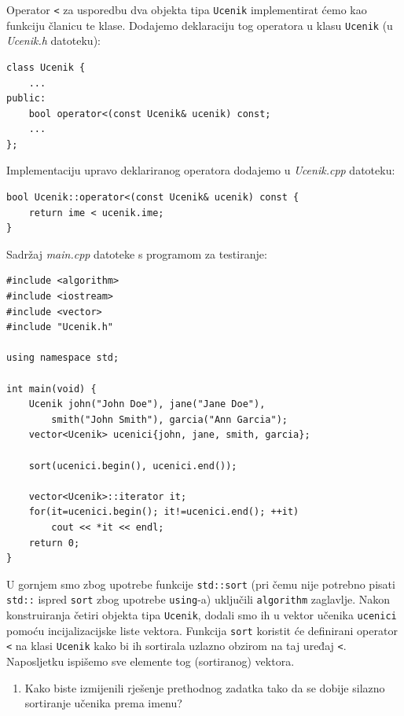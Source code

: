 \begin{rjesenje}
    Operator \texttt{<} za usporedbu dva objekta tipa \texttt{Ucenik}
    implementirat ćemo kao funkciju članicu te klase.
    Dodajemo deklaraciju tog operatora u klasu \texttt{Ucenik}
    (u \textit{Ucenik.h} datoteku):
    \begin{verbatim} 
class Ucenik {
    ...
public:
    bool operator<(const Ucenik& ucenik) const;
    ...
};
    \end{verbatim}
    Implementaciju upravo deklariranog operatora dodajemo u \textit{Ucenik.cpp} datoteku:
    \begin{verbatim}  
bool Ucenik::operator<(const Ucenik& ucenik) const { 
    return ime < ucenik.ime; 
}
    \end{verbatim}
    Sadržaj \textit{main.cpp} datoteke s programom za testiranje:
\begin{verbatim}
#include <algorithm>
#include <iostream>
#include <vector>
#include "Ucenik.h"

using namespace std;

int main(void) {
    Ucenik john("John Doe"), jane("Jane Doe"),
        smith("John Smith"), garcia("Ann Garcia");
    vector<Ucenik> ucenici{john, jane, smith, garcia};
    
    sort(ucenici.begin(), ucenici.end());
    
    vector<Ucenik>::iterator it;
    for(it=ucenici.begin(); it!=ucenici.end(); ++it)
        cout << *it << endl;
    return 0;
}
\end{verbatim}
U gornjem smo zbog upotrebe funkcije \texttt{std::sort}
(pri čemu nije potrebno pisati \texttt{std::} ispred \texttt{sort} zbog upotrebe \texttt{using}-a)
uključili \texttt{algorithm} zaglavlje.
Nakon konstruiranja četiri objekta tipa \texttt{Ucenik},
dodali smo ih u vektor učenika \texttt{ucenici}
pomoću incijalizacijske liste vektora.
Funkcija \texttt{sort} koristit će definirani operator \texttt{<} na klasi \texttt{Ucenik}
kako bi ih sortirala uzlazno obzirom na taj uređaj \texttt{<}.
Naposljetku ispišemo sve elemente tog (sortiranog) vektora.
\end{rjesenje}


\begin{razmisljanje}
    \begin{enumerate}
        \item 
        Kako biste izmijenili rješenje prethodnog zadatka tako da se dobije silazno
        sortiranje učenika prema imenu?
    \end{enumerate}
\end{razmisljanje}


